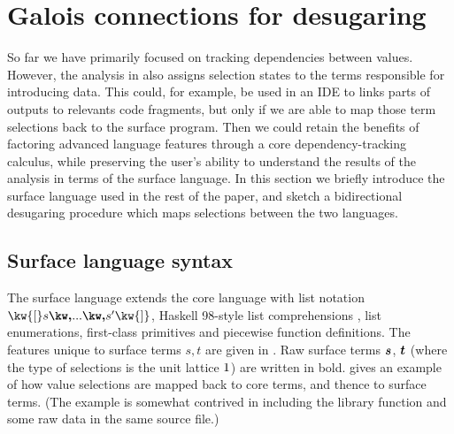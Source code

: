 \newpage
\section{Galois connections for desugaring}
\label{sec:surface-language}

 So far we have primarily focused on tracking dependencies between values. However, the analysis in  also assigns selection states to the terms responsible for introducing data. This could, for example, be used in an IDE to links parts of outputs to relevants code fragments, but only if we are able to map those term selections back to the surface program. Then we could retain the benefits of factoring advanced language features through a core dependency-tracking calculus, while preserving the user's ability to understand the results of the analysis in terms of the surface language. In this section we briefly introduce the surface language \OurLanguage{} used in the rest of the paper, and sketch a bidirectional desugaring procedure which maps selections between the two languages.




\subsection{Surface language syntax}

The surface language \OurLanguage{} extends the core language with list notation $\kw{[} s \comma \ldots \comma s' \kw{]}$, Haskell 98-style list comprehensions \cite{peytonJones03}, list enumerations, first-class primitives and piecewise function definitions. The features unique to surface terms $s, t$ are given in . Raw surface terms $\bm{s}$, $\bm{t}$ (where the type of selections is the unit lattice $1$) are written in bold.  gives an example of how value selections are mapped back to core terms, and thence to surface terms. (The example is somewhat contrived in including the library function  and some raw data in the same source file.)

